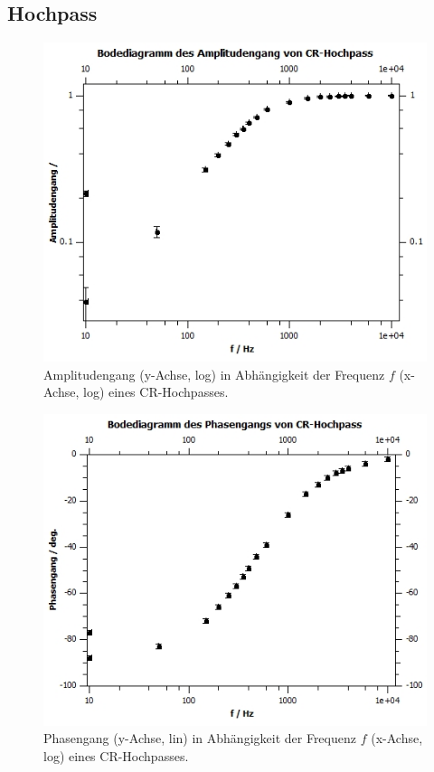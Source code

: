 \documentclass[12pt,a4paper,twoside]{article}
\begin{document}
\subsection{Hochpass}
\begin{figure}[H]
    \centering
    \includegraphics[width=0.6\linewidth]{nudes/Plot a1 amp.jpg}
    \caption{Amplitudengang (y-Achse, log) in Abhängigkeit der Frequenz $f$ (x-Achse, log) eines CR-Hochpasses. }
    \label{fig:zus a1 amp} 
\end{figure}

\begin{figure}[H]
    \centering
    \includegraphics[width=0.6\linewidth]{nudes/Plot a1 ph.jpg}
    \caption{Phasengang (y-Achse, lin) in Abhängigkeit der Frequenz $f$ (x-Achse, log) eines CR-Hochpasses. }
    \label{fig:zus a1 ph} 
\end{figure}
\end{document}
